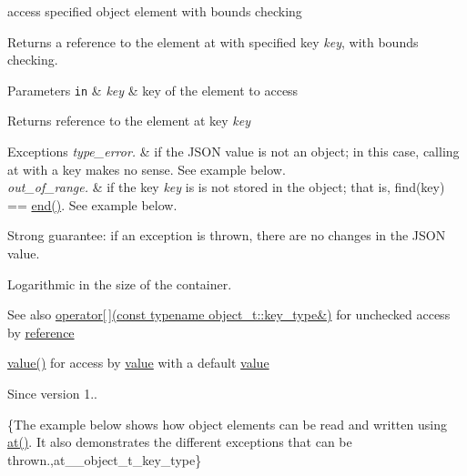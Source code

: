 access specified object element with bounds checking 

Returns a reference to the element at with specified key {\itshape key}, with bounds checking.


\begin{DoxyParams}[1]{Parameters}
\mbox{\tt in}  & {\em key} & key of the element to access\\
\hline
\end{DoxyParams}
\begin{DoxyReturn}{Returns}
reference to the element at key {\itshape key} 
\end{DoxyReturn}

\begin{DoxyExceptions}{Exceptions}
{\em type\+\_\+error.} & if the J\+S\+ON value is not an object; in this case, calling {\ttfamily at} with a key makes no sense. See example below. \\
\hline
{\em out\+\_\+of\+\_\+range.} & if the key {\itshape key} is is not stored in the object; that is, {\ttfamily find(key) == \hyperlink{classnlohmann_1_1basic__json_a931267ec3f09eb67e4382f321b2c52bc}{end()}}. See example below.\\
\hline
\end{DoxyExceptions}
Strong guarantee\+: if an exception is thrown, there are no changes in the J\+S\+ON value.

Logarithmic in the size of the container.

\begin{DoxySeeAlso}{See also}
\hyperlink{classnlohmann_1_1basic__json_a3f45f3820c456ad2e3f3df2926564151}{operator\mbox{[}$\,$\mbox{]}(const typename object\+\_\+t\+::key\+\_\+type\&)} for unchecked access by \hyperlink{classnlohmann_1_1basic__json_a220ae98554a76205fb7f8822d36b2d5a}{reference} 

\hyperlink{classnlohmann_1_1basic__json_ac9e014095170d72c4c57e3daf8efc059}{value()} for access by \hyperlink{classnlohmann_1_1basic__json_ac9e014095170d72c4c57e3daf8efc059}{value} with a default \hyperlink{classnlohmann_1_1basic__json_ac9e014095170d72c4c57e3daf8efc059}{value}
\end{DoxySeeAlso}
\begin{DoxySince}{Since}
version 1..
\end{DoxySince}
\{The example below shows how object elements can be read and written using {\ttfamily \hyperlink{classnlohmann_1_1basic__json_a52b18a5b7e68652c65b070900c438c6e}{at()}}. It also demonstrates the different exceptions that can be thrown.,at\+\_\+\+\_\+object\+\_\+t\+\_\+key\+\_\+type\} 
